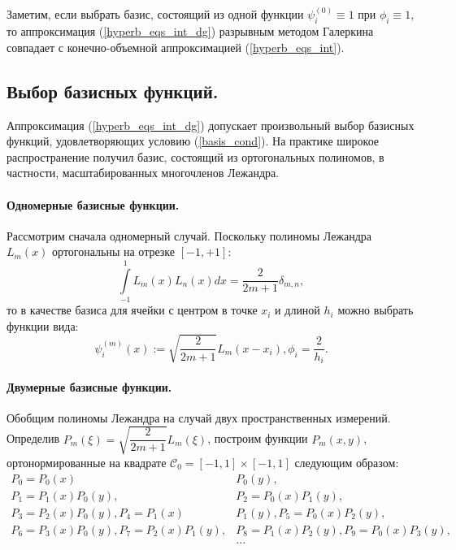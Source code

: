 \documentclass[14pt, a4paper, fleqn]{extreport}
\begin{document}
    Заметим, если выбрать базис, 
    состоящий из одной функции $\psi_i^{(0)} \equiv 1$ при $\phi_i \equiv 1$, то
    аппроксимация (\ref{hyperb_eqs_int_dg}) разрывным методом Галеркина
    совпадает с конечно-объемной аппроксимацией (\ref{hyperb_eqs_int}).
     
    \subsection{Выбор базисных функций.}
    
    Аппроксимация (\ref{hyperb_eqs_int_dg}) допускает
    произвольный выбор базисных функций, удовлетворяющих условию (\ref{basis_cond}).
    На практике широкое распространение получил базис, состоящий из ортогональных полиномов,
    в частности, масштабированных многочленов Лежандра.
        
    \paragraph{Одномерные базисные функции.}
    Рассмотрим сначала одномерный случай.
    Поскольку полиномы Лежандра $L_m(x)$ ортогональны на отрезке $[-1, +1]$:
    \begin{equation*}
        \int\limits_{-1}^1 L_m(x) L_n(x) dx = \dfrac{2}{2m + 1}\delta_{m,n},
    \end{equation*}
    то в качестве базиса для ячейки с центром в точке $x_i$ и длиной $h_i$ можно выбрать функции
    вида:
    \begin{equation*}
    \boxed{
        \psi_i^{(m)}(x) := \sqrt{\dfrac{2}{2m+1}} L_m(x - x_i), \phi_i = \dfrac{2}{h_i}.
    }
    \end{equation*}
    
      \paragraph{Двумерные базисные функции.}
    Обобщим полиномы Лежандра на случай двух пространственных измерений.
    Определив $P_m(\xi) = \sqrt{\dfrac{2}{2m+1}} L_m(\xi)$, построим функции $P_m(x,y)$, 
    ортонормированные на квадрате $\mathcal{C}_0 = [-1, 1] \times [-1, 1]$ следующим образом:
    \begin{equation*}
    \begin{split}
        P_0 = P_0(x)&P_0(y), \\
        P_1 = P_1(x)P_0(y), & P_2 = P_0(x)P_1(y), \\
        P_3 = P_2(x)P_0(y), P_4 = P_1(x)&P_1(y), P_5 = P_0(x)P_2(y), \\
        P_6 = P_3(x)P_0(y), P_7 = P_2(x)P_1(y), &P_8 = P_1(x)P_2(y), P_9 = P_0(x)P_3(y), \\
        &...
    \end{split}
    \end{equation*}
    
\end{document}
